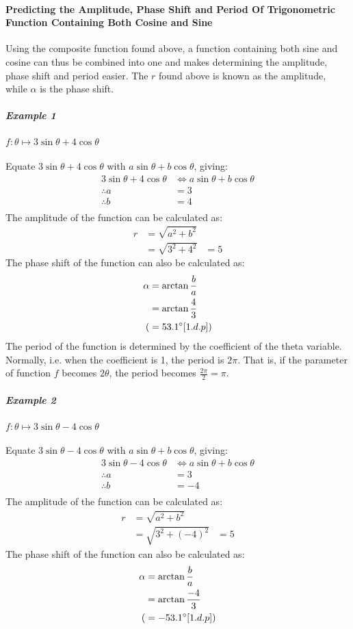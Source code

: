 \documentclass{article}
\begin{document}
        \paragraph{Predicting the Amplitude, Phase Shift and Period Of Trigonometric Function Containing Both Cosine and Sine} Using the composite function found above, a function containing both sine and cosine can thus be combined into one and makes determining the amplitude, phase shift and period easier. The $r$ found above is known as the amplitude, while $\alpha$ is the phase shift.
        \subparagraph{Example 1} $f:\theta \mapsto 3\sin{\theta} + 4\cos{\theta}$ \\\\
        Equate $3\sin{\theta} + 4\cos{\theta}$ with $a\sin{\theta} + b\cos{\theta}$, giving:
        \begin{align*}
        	3\sin{\theta} + 4\cos{\theta} &\Leftrightarrow a\sin{\theta} + b\cos{\theta} \\
        	\therefore a &= 3 \\
        	\therefore b &= 4 \\
        \end{align*}
        The amplitude of the function can be calculated as:
		\begin{align*}
			r &= \sqrt{a^2 + b^2} \\
			&= \sqrt{3^2 + 4^2}
			&= 5
		\end{align*}
		The phase shift of the function can also be calculated as:
		\begin{align*}
			\alpha &= \arctan{\frac{b}{a}} \\
			&= \arctan{\frac{4}{3}} \\
			(&= 53.1\degree [1.d.p]) 
		\end{align*}
		The period of the function is determined by the coefficient of the theta variable. Normally, i.e. when the coefficient is 1, the period is $2\pi$. That is, if the parameter of function $f$ becomes $2\theta$, the period becomes $\frac{2\pi}{2} = \pi$. \\
		\subparagraph{Example 2} $f:\theta \mapsto 3\sin{\theta} - 4\cos{\theta}$ \\\\
		Equate $3\sin{\theta} - 4\cos{\theta}$ with $a\sin{\theta} + b\cos{\theta}$, giving:
		\begin{align*}
		3\sin{\theta} - 4\cos{\theta} &\Leftrightarrow a\sin{\theta} + b\cos{\theta} \\
		\therefore a &= 3 \\
		\therefore b &= -4 \\
		\end{align*}
		The amplitude of the function can be calculated as:
		\begin{align*}
		r &= \sqrt{a^2 + b^2} \\
		&= \sqrt{3^2 + (-4)^2}
		&= 5
		\end{align*}
		The phase shift of the function can also be calculated as:
		\begin{align*}
		\alpha &= \arctan{\frac{b}{a}} \\
		&= \arctan{\frac{-4}{3}} \\
		(&= -53.1\degree [1.d.p]) 
		\end{align*}
        
    \newpage
    
\end{document}
